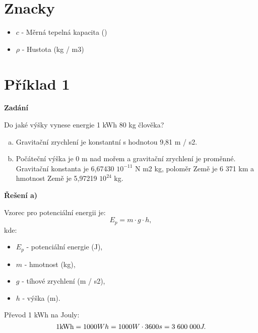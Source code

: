 \documentclass{article}
\begin{document}



\maketitle
\tableofcontents
\newpage



\section*{Znacky}

\begin{itemize}
    \item $c$ - Měrná tepelná kapacita (\ueqJperKGperK)
    \item $\rho$ - Hustota (kg / m3)
\end{itemize}

\newpage



\section*{Příklad 1}

\textbf{Zadání}

Do jaké výšky vynese energie 1 kWh 80 kg člověka?

\begin{enumerate}[a)]
    \item Gravitační zrychlení je konstantní s hodnotou 9,81 m / s2.
    \item Počáteční výška je 0 m nad mořem a gravitační zrychlení je proměnné. Gravitační konstanta je 6,67430 \myFS $10^{-11}$ N \myFS m2 \myFS kg, poloměr Země je 6 371 km a hmotnost Země je 5,97219 \myFS $10^{24}$ kg.
\end{enumerate}

\textbf{Řešení a)}

Vzorec pro potenciální energii je:
$$
    E_p = m \cdot g \cdot h,
$$
kde:
\begin{itemize}
    \item $E_p$ - potenciální energie (J),
    \item $m$ - hmotnost (kg),
    \item $g$ - tíhové zrychlení (m / s2),
    \item $h$ - výška (m).
\end{itemize}

Převod 1 kWh na Jouly:
$$
    1 \textrm{kWh} = 1000 Wh = 1000 W \cdot 3600 s = 3 \; 600 \; 000 J.
$$
\end{document}
